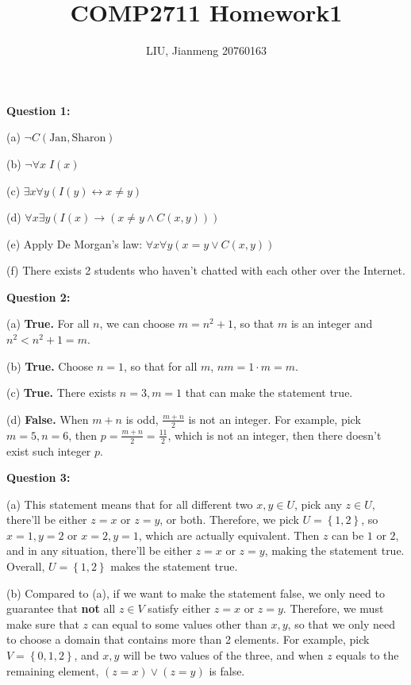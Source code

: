 \documentclass[a4paper,12pt]{article}
\title{\textbf{COMP2711} Homework1}
\author{LIU, Jianmeng 20760163}
\date{}
\begin{document}
    \maketitle

    \begin{spacing}{1.4}

    \textbf{Question 1:}

    (a) $\neg C(\text{Jan}, \text{Sharon})$

    (b) $\neg \forall x\;I(x)$

    (c) $\exists x \forall y \left(I(y) \leftrightarrow x \ne y\right)$

    (d) $\forall x \exists y
    \left( I\left(x\right) \rightarrow 
    \left( x\ne y \wedge C(x,y) \right) \right)$

    (e) Apply De Morgan's law: $\forall x \forall y 
    \left( x=y \vee C(x,y) \right)$

    (f) There exists 2 students who haven't chatted 
    with each other over the Internet.

    \vspace{30px}

    \textbf{Question 2:}

    (a) \textbf{True.} For all $n$, we can choose $m=n^2+1$,
    so that $m$ is an integer and $n^2<n^2+1=m$.

    (b) \textbf{True.} Choose $n=1$, so that for all $m$,
    $nm=1\cdot m = m$.

    (c) \textbf{True.} There exists $n=3, m=1$ that can make
    the statement true.

    (d) \textbf{False.} When $m+n$ is odd, $\frac{m+n}{2}$ is 
    not an integer. For example,
    pick $m=5, n=6$, then $p=\frac{m+n}{2}=\frac{11}{2}$, which
    is not an integer, then there doesn't exist such integer $p$.

    \vspace{30px}

    \textbf{Question 3:}

    (a) This statement means that for all different two $x,y\in U$,
    pick any $z\in U$, there'll be either $z=x$ or $z=y$, or both.
    Therefore, we pick $U=\left\{ 1,2 \right\}$, so $x=1, y=2$ or 
    $x=2, y=1$, which are actually equivalent. Then $z$ can be $1$ 
    or $2$, and in any situation, there'll be either $z=x$ or $z=y$,
    making the statement true. Overall, $U=\left\{ 1,2 \right\}$
    makes the statement true.

    (b) Compared to (a), if we want to make the statement false,
    we only need to guarantee that \textbf{not} all $z\in V$
    satisfy either $z=x$ or $z=y$. Therefore, we must make sure
    that $z$ can equal to some values other than $x,y$, so that
    we only need to choose a domain that contains more than 2 elements.
    For example, pick $V=\left\{ 0,1,2 \right\}$, and $x,y$ will be 
    two values of the three, and when $z$ equals to the remaining 
    element, $(z=x)\vee (z=y)$ is false.


\end{spacing}
\end{document}
